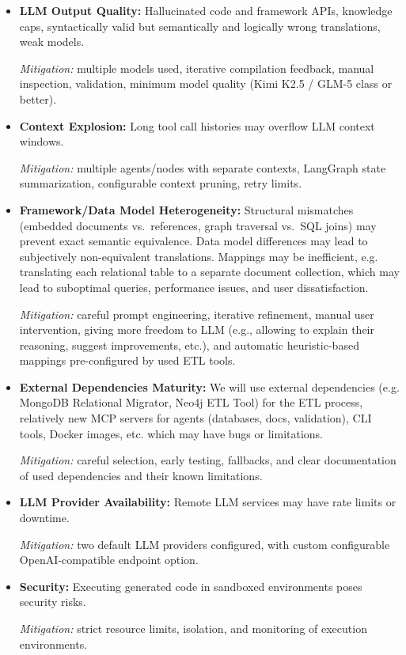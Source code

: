 \documentclass{article}
\begin{document}
\begin{itemize}
  \item \textbf{LLM Output Quality:} Hallucinated code and framework APIs, knowledge caps, syntactically valid but semantically and logically wrong translations, weak models. 
  
  \emph{Mitigation:} multiple models used, iterative compilation feedback, manual inspection, validation, minimum model quality (Kimi K2.5 / GLM-5 class or better).
  \item \textbf{Context Explosion:} Long tool call histories may overflow LLM context windows.
  
  \emph{Mitigation:} multiple agents/nodes with separate contexts, LangGraph state summarization, configurable context pruning, retry limits.
  \item \textbf{Framework/Data Model Heterogeneity:} Structural mismatches (embedded documents vs.\ references, graph traversal vs.\ SQL joins) may prevent exact semantic equivalence. Data model differences may lead to subjectively non-equivalent translations. Mappings may be inefficient, e.g. translating each relational table to a separate document collection, which may lead to suboptimal queries, performance issues, and user dissatisfaction.
  
  \emph{Mitigation:} careful prompt engineering, iterative refinement, manual user intervention, giving more freedom to LLM (e.g., allowing to explain their reasoning, suggest improvements, etc.), and automatic heuristic-based mappings pre-configured by used ETL tools.
  \item \textbf{External Dependencies Maturity:} We will use external dependencies (e.g. MongoDB Relational Migrator, Neo4j ETL Tool) for the ETL process, relatively new MCP servers for agents (databases, docs, validation), CLI tools, Docker images, etc. which may have bugs or limitations. 
  
  \emph{Mitigation:} careful selection, early testing, fallbacks, and clear documentation of used dependencies and their known limitations.
  \item \textbf{LLM Provider Availability:} Remote LLM services may have rate limits or downtime. 
  
  \emph{Mitigation:} two default LLM providers configured, with custom configurable OpenAI-compatible endpoint option.
  \item \textbf{Security:} Executing generated code in sandboxed environments poses security risks. 
  
  \emph{Mitigation:} strict resource limits, isolation, and monitoring of execution environments.
\end{itemize}
\end{document}
